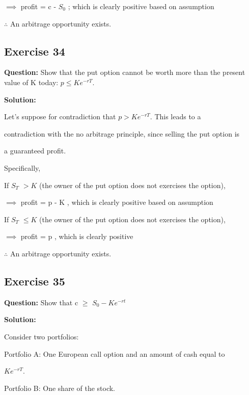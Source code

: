 \documentclass{article}
\begin{document}
$\implies$ profit = c - $S_0$ ; which is clearly positive based on assumption

$\therefore$  An arbitrage opportunity exists.

\subsection*{Exercise 34}

\textbf{Question:} Show that the put option cannot be worth more than the present value of K today:
$p \leq Ke^{-rT}$.
 
\textbf{Solution:}

Let's suppose for contradiction that $ p > Ke^{-rT} $. This leads to a 

contradiction with the no arbitrage principle, since selling the put option 
is 

a guaranteed profit.

\vspace{\baselineskip}

Specifically,

If  $S_T$ $> K$ (the owner of the put option does not exercises the option),

$\implies$ profit = p - K , which is clearly positive based on assumption

\vspace{\baselineskip}

If  $S_T$ $\leq K$ (the owner of the put option does not exercises the option),

$\implies$ profit = p , which is clearly positive

$\therefore$  An arbitrage opportunity exists.

\subsection*{Exercise 35}

\textbf{Question:} Show that c $\geq$ $S_{0} -Ke^{-rt}$
 
\textbf{Solution:}

Consider two portfolios:

\vspace{\baselineskip}

Portfolio A: One European call option and an amount of cash equal to 

\( Ke^{-rT} \).

Portfolio B: One share of the stock.

\vspace{\baselineskip}
\end{document}
